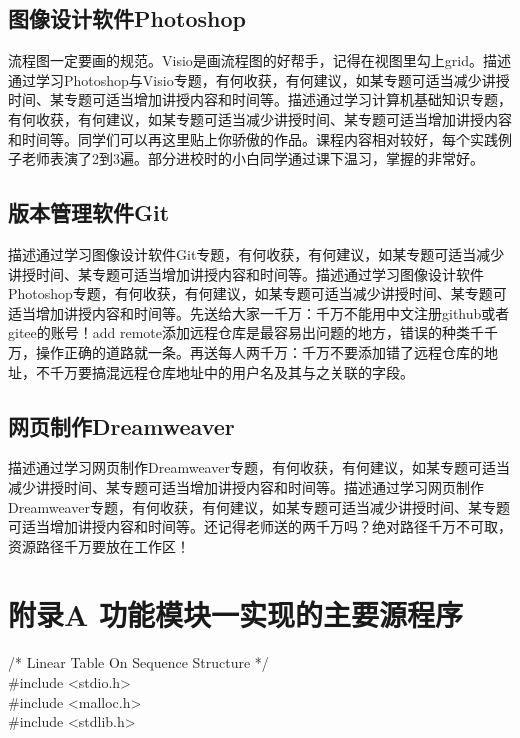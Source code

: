 \documentclass[supercite]{Experimental_Report}
\theoremstyle{definition}
\begin{document}
\subsection{图像设计软件Photoshop}

流程图一定要画的规范。Visio是画流程图的好帮手，记得在视图里勾上grid。描述通过学习Photoshop与Visio专题，有何收获，有何建议，如某专题可适当减少讲授时间、某专题可适当增加讲授内容和时间等。描述通过学习计算机基础知识专题，有何收获，有何建议，如某专题可适当减少讲授时间、某专题可适当增加讲授内容和时间等。同学们可以再这里贴上你骄傲的作品。课程内容相对较好，每个实践例子老师表演了2到3遍。部分进校时的小白同学通过课下温习，掌握的非常好。

\subsection{版本管理软件Git}

描述通过学习图像设计软件Git专题，有何收获，有何建议，如某专题可适当减少讲授时间、某专题可适当增加讲授内容和时间等。描述通过学习图像设计软件Photoshop专题，有何收获，有何建议，如某专题可适当减少讲授时间、某专题可适当增加讲授内容和时间等。先送给大家一千万：千万不能用中文注册github或者gitee的账号！add remote添加远程仓库是最容易出问题的地方，错误的种类千千万，操作正确的道路就一条。再送每人两千万：千万不要添加错了远程仓库的地址，不千万要搞混远程仓库地址中的用户名及其与之关联的字段。

\subsection{网页制作Dreamweaver}

描述通过学习网页制作Dreamweaver专题，有何收获，有何建议，如某专题可适当减少讲授时间、某专题可适当增加讲授内容和时间等。描述通过学习网页制作Dreamweaver专题，有何收获，有何建议，如某专题可适当减少讲授时间、某专题可适当增加讲授内容和时间等。还记得老师送的两千万吗？绝对路径千万不可取，资源路径千万要放在工作区！


\nocite{*} %



\setcounter{secnumdepth}{0}
\appendix

\section{附录A 功能模块一实现的主要源程序}

\noindent
/* Linear Table On Sequence Structure */\\
\#include <stdio.h>\\
\#include <malloc.h>\\
\#include <stdlib.h>\\
\end{document}
